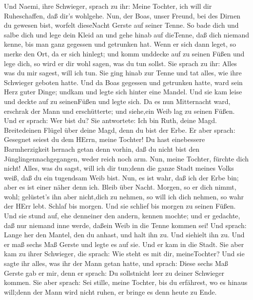  Und Naemi, ihre Schwieger, sprach zu ihr: Meine Tochter,
ich will dir Ruheschaffen, daß dir's wohlgehe.  Nun, der
Boas, unser Freund, bei des Dirnen du gewesen bist, worfelt dieseNacht
Gerste auf seiner Tenne.  So bade dich und salbe dich und
lege dein Kleid an und gehe hinab auf dieTenne, daß dich niemand kenne,
bis man ganz gegessen und getrunken hat.  Wenn er sich dann
leget, so merke den Ort, da er sich hinlegt; und komm unddecke auf zu
seinen Füßen und lege dich, so wird er dir wohl sagen, was du tun
sollst.  Sie sprach zu ihr: Alles was du mir sagest, will
ich tun.  Sie ging hinab zur Tenne und tat alles, wie ihre
Schwieger geboten hatte.  Und da Boas gegessen und getrunken
hatte, ward sein Herz guter Dinge; undkam und legte sich hinter eine
Mandel. Und sie kam leise und deckte auf zu seinenFüßen und legte sich.
 Da es nun Mitternacht ward, erschrak der Mann und
erschütterte; und siehe,ein Weib lag zu seinen Füßen.  Und
er sprach: Wer bist du? Sie antwortete: Ich bin Ruth, deine Magd.
Breitedeinen Flügel über deine Magd, denn du bist der Erbe.
 Er aber sprach: Gesegnet seiest du dem HErrn, meine
Tochter! Du hast einebessere Barmherzigkeit hernach getan denn vorhin,
daß du nicht bist den Jünglingennachgegangen, weder reich noch arm.
 Nun, meine Tochter, fürchte dich nicht! Alles, was du
sagst, will ich dir tun;denn die ganze Stadt meines Volks weiß, daß du
ein tugendsam Weib bist.  Nun, es ist wahr, daß ich der
Erbe bin; aber es ist einer näher denn ich.  Bleib über
Nacht. Morgen, so er dich nimmt, wohl; gelüstet's ihn aber nicht,dich zu
nehmen, so will ich dich nehmen, so wahr der HErr lebt. Schlaf bis
morgen.  Und sie schlief bis morgen zu seinen Füßen. Und
sie stund auf, ehe denneiner den andern, kennen mochte; und er gedachte,
daß nur niemand inne werde, daßein Weib in die Tenne kommen sei!
 Und sprach: Lange her den Mantel, den du anhast, und halt
ihn zu. Und siehielt ihn zu. Und er maß sechs Maß Gerste und legte es
auf sie. Und er kam in die Stadt.  Sie aber kam zu ihrer
Schwieger, die sprach: Wie steht es mit dir, meineTochter? Und sie sagte
ihr alles, was ihr der Mann getan hatte,  und sprach: Diese
sechs Maß Gerste gab er mir, denn er sprach: Du sollstnicht leer zu
deiner Schwieger kommen.  Sie aber sprach: Sei stille,
meine Tochter, bis du erfährest, wo es hinaus will;denn der Mann wird
nicht ruhen, er bringe es denn heute zu Ende.

